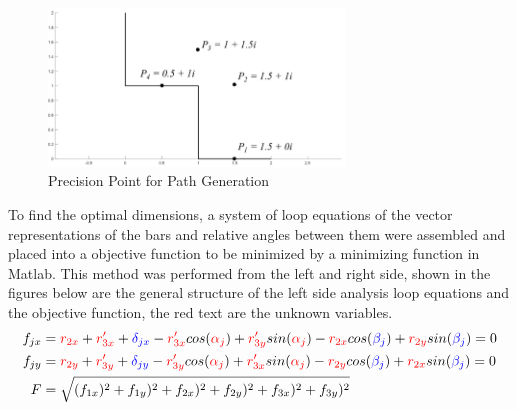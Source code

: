 \documentclass[12pt]{article}
\begin{document}
\begin{figure}[h!]
    \centering
    \includegraphics[width=0.7\textwidth]{path_generation.png}
    \caption{Precision Point for Path Generation}
    \label{fig:precionpoints_PG}
\end{figure}
To find the optimal dimensions, a system of loop equations of the vector representations of the bars and relative angles between them were assembled and placed into a objective function to be minimized by a minimizing function in Matlab. This method was performed from the left and right side, shown in the figures below are the general structure of the left side analysis loop equations and the objective function, the red text are the unknown variables.
\begin{align}
    f_{jx}&=\color{red}r_{2x}\color{black}+\color{red}r'_{3x}\color{black}+\color{blue}\delta_{jx}\color{black}-\color{red}r'_{3x}\color{black}cos(\color{red}\alpha_j\color{black})+\color{red}r'_{3y}\color{black}sin(\color{red}\alpha_j\color{black})-\color{red}r_{2x}\color{black}cos(\color{blue}\beta_j\color{black})+\color{red}r_{2y}\color{black}sin(\color{blue}\beta_j\color{black})=0\\
    f_{jy}&=\color{red}r_{2y}\color{black}+\color{red}r'_{3y}\color{black}+\color{blue}\delta_{jy}\color{black}-\color{red}r'_{3y}\color{black}cos(\color{red}\alpha_j\color{black})+\color{red}r'_{3x}\color{black}sin(\color{red}\alpha_j\color{black})-\color{red}r_{2y}\color{black}cos(\color{blue}\beta_j\color{black})+\color{red}r_{2x}\color{black}sin(\color{blue}\beta_j\color{black})=0\\
    F&=\sqrt{(f_{1x})^2+f_{1y})^2+f_{2x})^2+f_{2y})^2+f_{3x})^2+f_{3y})^2}
\end{align}
\end{document}
